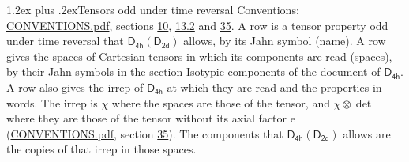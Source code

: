 \documentclass[10pt,a4paper]{article}
\makeatletter
\renewcommand\section{\@startsection{section}{1}{\z@}{-3ex plus -1ex minus -.2ex}%
  {1.2ex plus .2ex}{\normalfont\large\sffamily\bfseries\color{parttitle}}}
\numberwithin{equation}{section}
\newcommand{\grp}[1]{\mathsf{#1}}
\newcommand{\irrprod}{\otimes}
\makeatother
\begin{document}
\section{Tensors odd under time reversal}\label{s:time_odd}
Conventions: \href{../../CONVENTIONS.pdf}{CONVENTIONS.pdf}, sections \href{../../../rotation/CONVENTIONS.pdf\#conv.10}{10}, \href{../../../rotation/CONVENTIONS.pdf\#conv.13.2}{13.2} and \href{../../CONVENTIONS.pdf\#conv.35}{35}.
\leavevmode\label{n:head.name.property}A row is a tensor property odd under time reversal that $\grp{D_{4h}}(\grp{D_{2d}})$ allows, by its Jahn symbol (name). \label{n:head.spaces}A row gives the spaces of Cartesian tensors in which its components are read (spaces), by their Jahn symbols in the section Isotypic components of the document of \href{../../../rotation/data/pdf/D4h.pdf}{$\grp{D_{4h}}$}. \label{n:head.properties}A row also gives the irrep of $\grp{D_{4h}}$ at which they are read and the properties in words. The irrep is $\chi$ where the spaces are those of the tensor, and $\chi \irrprod \det$ where they are those of the tensor without its axial factor e (\href{../../CONVENTIONS.pdf}{CONVENTIONS.pdf}, section \href{../../CONVENTIONS.pdf\#conv.35}{35}). The components that $\grp{D_{4h}}(\grp{D_{2d}})$ allows are the copies of that irrep in those spaces.
\end{document}
